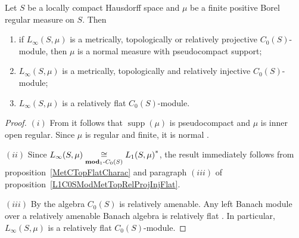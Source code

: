 \begin{proposition}\label{LinftyC0SModMetTopRelProjIngFlat} Let $S$ be a locally
compact Hausdorff space and $\mu$ be a finite positive Borel regular measure on
$S$. Then

\begin{enumerate}[label = (\roman*)]
    \item if $L_\infty(S,\mu)$ is a metrically, topologically or relatively 
    projective $C_0(S)$-module, then $\mu$ is a normal measure 
    with pseudocompact support; 

    \item $L_\infty(S,\mu)$ is a metrically, topologically and relatively 
    injective $C_0(S)$-module;

    \item $L_\infty(S,\mu)$ is a relatively flat $C_0(S)$-module.
\end{enumerate}
\end{proposition}
\begin{proof} $(i)$ From \cite[theorem 3]{NemRelProjModLp} it follows 
that $\operatorname{supp}(\mu)$ is pseudocompact and $\mu$ is inner open 
regular. Since $\mu$ is regular and finite, it is 
normal \cite[proposition 9]{NemRelProjModLp}.
    
$(ii)$ Since
$L_\infty(S,\mu)\mathrel{\mathop{\cong}\limits_{\mathbf{mod}_1\text{-}C_0(S)}}{L_1(S,\mu)}^*$, the result
immediately follows from proposition~\ref{MetCTopFlatCharac} and paragraph
$(iii)$ of proposition~\ref{L1C0SModMetTopRelProjInjFlat}.

$(iii)$ By \cite[theorem 7.1.87]{HelBanLocConvAlg} the algebra $C_0(S)$ is
relatively amenable. Any left Banach module over a relatively amenable Banach
algebra is relatively flat \cite[theorem 7.1.60]{HelBanLocConvAlg}. In
particular, $L_\infty(S,\mu)$ is a relatively flat $C_0(S)$-module.
\end{proof}

